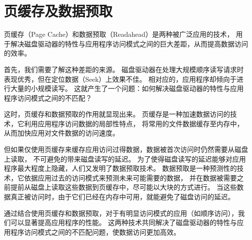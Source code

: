 \section{页缓存及数据预取}
页缓存（Page Cache）和数据预取（Readahead）是两种被广泛应用的技术，
用于解决磁盘驱动器的特性与应用程序访问模式之间的巨大差距，从而提高数据访问的效率。

首先，我们需要了解这种差距的来源。
磁盘驱动器在处理大规模顺序读写请求时表现优秀，但在定位数据（Seek）上效果不佳。
相对应的，应用程序却倾向于进行大量的小规模读写。
这就产生了一个问题：如何解决磁盘驱动器的特性与应用程序访问模式之间的不匹配？

这时，页缓存和数据预取的作用就显现出来。
页缓存是一种加速数据访问的技术，它利用应用程序访问数据的局部性特点，
将常用的文件数据缓存至内存中，从而加快应用对文件数据的访问速度。

但如果仅使用页缓存来缓存应用访问过得数据，数据被首次访问时仍然需要从磁盘上读取，
不可避免的带来磁盘读写的延迟。
为了使得磁盘读写的延迟能够对应用程序最大程度上隐藏，人们又发明了数据预取技术。
数据预取是一种预测性的技术，它依据应用过去的访问模式来预测未来可能需要的数据，
并在数据被需要之前提前从磁盘上读取这些数据到页缓存中，尽可能以大块的方式进行。
当这些数据真正被访问时，由于它们已经在内存中可用，就能避免了磁盘访问的延迟。

通过结合使用页缓存和数据预取，对于有明显访问模式的应用（如顺序访问），我们可以显著提高应用程序的性能。
这两种技术共同解决了磁盘驱动器的特性与应用程序访问模式之间的不匹配问题，使数据访问更加高效。


